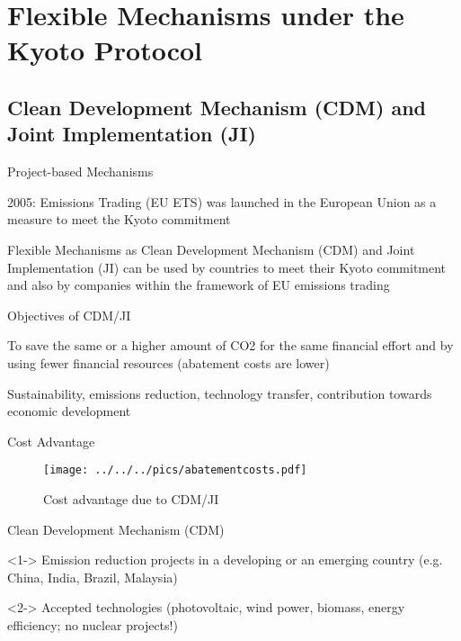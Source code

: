 \section{Flexible Mechanisms under the Kyoto Protocol}
\subsection{Clean Development Mechanism (CDM) and Joint Implementation (JI)}

{Project-based Mechanisms}






	2005:  Emissions Trading (EU ETS) was launched in the European Union as a measure to meet the Kyoto commitment


	Flexible Mechanisms as Clean Development Mechanism (CDM) and Joint Implementation (JI) can be used by countries to meet their Kyoto commitment and also by companies within the framework of EU emissions trading




Objectives of CDM/JI






	To save the same or a higher amount of CO2 for the same financial effort and by using fewer financial resources (abatement costs are lower)


	Sustainability, emissions reduction, technology transfer, contribution towards economic development


{Cost Advantage}
\begin{figure}[h!]
\centering
\texttt{[image: ../../../pics/abatementcosts.pdf]}
\caption{Cost advantage due to CDM/JI}
\label{fig:CDM/JI}
\end{figure}


{Clean Development Mechanism (CDM)}






	<1-> Emission reduction projects in a developing or an emerging country (e.g. China, India, Brazil, Malaysia)


	<2-> Accepted technologies (photovoltaic, wind power, biomass, energy efficiency; no nuclear projects!)


